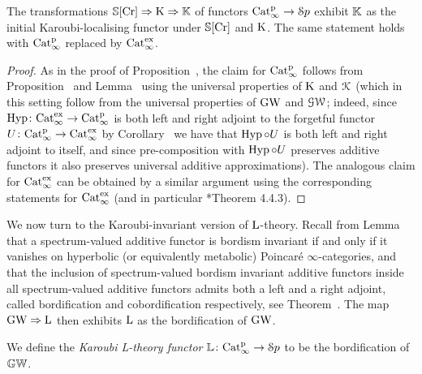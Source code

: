 \begin{proposition}
\label{proposition:universal-KK}%
The transformations $\mathbb{S}[\mathrm{Cr}] \Rightarrow \operatorname K \Rightarrow \mathbb K$ of functors $\mathrm{Cat}^{\mathrm p}_\infty\to {\mathcal Sp}$ exhibit $\mathbb K$ as the initial Karoubi-localising functor under $\mathbb{S}[\mathrm{Cr}]$ and $\operatorname K$. The same statement holds with $\mathrm{Cat}^{\mathrm p}_\infty$ replaced by $\mathrm{Cat}_\infty^{\mathrm{ex}}$.
\end{proposition}
\begin{proof}
As in the proof of Proposition~, the claim for $\mathrm{Cat}^{\mathrm p}_\infty$ follows from Proposition~
and Lemma~ using the universal properties of $\operatorname K$ and $\operatorname{\mathcal{K}}$ (which in this setting follow from the universal properties of $\operatorname{GW}$ and $\operatorname{\mathcal{GW}}$; indeed, since $\operatorname{Hyp}\colon \mathrm{Cat}_\infty^{\mathrm{ex}} \to \mathrm{Cat}^{\mathrm p}_\infty$ is both left and right adjoint to the forgetful functor $U\colon \mathrm{Cat}^{\mathrm p}_\infty \to \mathrm{Cat}_\infty^{\mathrm{ex}}$ by Corollary~ we have that $\operatorname{Hyp}\circ U$ is both left and right adjoint to itself, and since pre-composition with $\operatorname{Hyp}\circ U$ preserves additive functors it also preserves universal additive approximations). The analogous claim %
for $\mathrm{Cat}_\infty^{\mathrm{ex}}$ can be obtained by a similar argument using the corresponding statements for $\mathrm{Cat}_\infty^{\mathrm{ex}}$ (and in particular \cite{CK}*{Theorem 4.4.3}).
\end{proof}


\medskip 

We now turn to the Karoubi-invariant version of $\operatorname L$-theory. Recall from Lemma~
that a spectrum-valued additive functor is bordism invariant if and only if it vanishes on hyperbolic (or equivalently metabolic) Poincaré $\infty$-categories, and that the inclusion of spectrum-valued bordism invariant additive functors inside all spectrum-valued additive functors admits both a left and a right adjoint, called bordification and cobordification respectively, see Theorem~. The map $\operatorname{GW} \Rightarrow \operatorname L$ then exhibits $\operatorname L$ as the bordification of $\operatorname{GW}$.

\begin{definition}
We define the \emph{Karoubi L-theory functor} $\mathbb{L}\colon \mathrm{Cat}^{\mathrm p}_\infty\to{\mathcal Sp}$ to be the bordification of $\mathbb{GW}$.
\end{definition}



